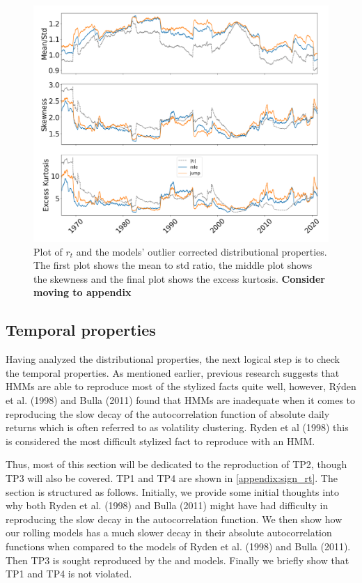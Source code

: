 \begin{figure}[H] 
    \centering
    \includegraphics[width=1.0\textwidth]{analysis/stylized_facts/images/moments_bulla_abs_outlier.png}
    \caption[Plot of $r_t$ and the models' outlier corrected distributional properties]{Plot of $r_t$ and the models' outlier corrected distributional properties. The first plot shows the mean to std ratio, the middle plot shows the skewness and the final plot shows the excess kurtosis. \textbf{Consider moving to appendix}}
    \label{fig:stylized_facts_moments_bulla_abs_outliers} 
\end{figure}

\subsection{Temporal properties}
\label{Sec: Temporal properties}

Having analyzed the distributional properties, the next logical step is to check the temporal properties. As mentioned earlier, previous research suggests that HMMs are able to reproduce most of the stylized facts quite well, however, Rýden et al. (1998) and Bulla (2011) found that HMMs are inadequate when it comes to reproducing the slow decay of the autocorrelation function of absolute daily returns which is often referred to as volatility clustering. Ryden et al (1998) this is considered the most difficult stylized fact to reproduce with an HMM.

Thus, most of this section will be dedicated to the reproduction of TP2, though TP3 will also be covered. TP1 and TP4 are shown in \cref{appendix:sign_rt}. The section is structured as follows. Initially, we provide some initial thoughts into why both Ryden et al. (1998) and Bulla (2011) might have had difficulty in reproducing the slow decay in the autocorrelation function. We then show how our rolling models has a much slower decay in their absolute autocorrelation functions when compared to the models of Ryden et al. (1998) and Bulla (2011). Then TP3 is sought reproduced by the \mle and \jump models. Finally we briefly show that TP1 and TP4 is not violated.

